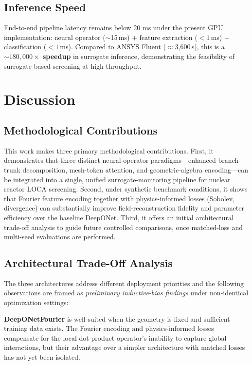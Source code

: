 \documentclass[journal]{IEEEtran}
\begin{document}
\subsection{Inference Speed}

End-to-end pipeline latency remains below 20 ms under the present GPU implementation: neural operator ($\sim$15\,ms) + feature extraction ($< 1$\,ms) + classification ($< 1$\,ms). Compared to ANSYS Fluent ($\approx$3,600\,s), this is a \textbf{${\sim}180{,}000\times$ speedup} in surrogate inference, demonstrating the feasibility of surrogate-based screening at high throughput.

\section{Discussion}
\label{sec:discussion}

\subsection{Methodological Contributions}

This work makes three primary methodological contributions. First, it demonstrates that three distinct neural-operator paradigms---enhanced branch-trunk decomposition, mesh-token attention, and geometric-algebra encoding---can be integrated into a single, unified surrogate-monitoring pipeline for nuclear reactor LOCA screening. Second, under synthetic benchmark conditions, it shows that Fourier feature encoding together with physics-informed losses (Sobolev, divergence) can substantially improve field-reconstruction fidelity and parameter efficiency over the baseline DeepONet. Third, it offers an initial architectural trade-off analysis to guide future controlled comparisons, once matched-loss and multi-seed evaluations are performed.

\subsection{Architectural Trade-Off Analysis}

The three architectures address different deployment priorities and the following observations are framed as \emph{preliminary inductive-bias findings} under non-identical optimization settings:

\textbf{DeepONetFourier} is well-suited when the geometry is fixed and sufficient training data exists. The Fourier encoding and physics-informed losses compensate for the local dot-product operator's inability to capture global interactions, but their advantage over a simpler architecture with matched losses has not yet been isolated.
\end{document}
